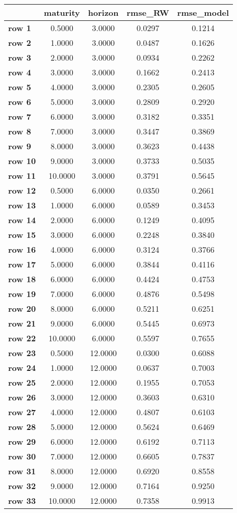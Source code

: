 \begin{tiny}\begin{tabular}{|l|c|c|c|c|}
\hline
&\textbf{maturity}&\textbf{horizon}&\textbf{rmse_RW}&\textbf{rmse_model}\\\hline
\textbf{row 1}&0.5000&3.0000&0.0297&0.1214\\\hline
\textbf{row 2}&1.0000&3.0000&0.0487&0.1626\\\hline
\textbf{row 3}&2.0000&3.0000&0.0934&0.2262\\\hline
\textbf{row 4}&3.0000&3.0000&0.1662&0.2413\\\hline
\textbf{row 5}&4.0000&3.0000&0.2305&0.2605\\\hline
\textbf{row 6}&5.0000&3.0000&0.2809&0.2920\\\hline
\textbf{row 7}&6.0000&3.0000&0.3182&0.3351\\\hline
\textbf{row 8}&7.0000&3.0000&0.3447&0.3869\\\hline
\textbf{row 9}&8.0000&3.0000&0.3623&0.4438\\\hline
\textbf{row 10}&9.0000&3.0000&0.3733&0.5035\\\hline
\textbf{row 11}&10.0000&3.0000&0.3791&0.5645\\\hline
\textbf{row 12}&0.5000&6.0000&0.0350&0.2661\\\hline
\textbf{row 13}&1.0000&6.0000&0.0589&0.3453\\\hline
\textbf{row 14}&2.0000&6.0000&0.1249&0.4095\\\hline
\textbf{row 15}&3.0000&6.0000&0.2248&0.3840\\\hline
\textbf{row 16}&4.0000&6.0000&0.3124&0.3766\\\hline
\textbf{row 17}&5.0000&6.0000&0.3844&0.4116\\\hline
\textbf{row 18}&6.0000&6.0000&0.4424&0.4753\\\hline
\textbf{row 19}&7.0000&6.0000&0.4876&0.5498\\\hline
\textbf{row 20}&8.0000&6.0000&0.5211&0.6251\\\hline
\textbf{row 21}&9.0000&6.0000&0.5445&0.6973\\\hline
\textbf{row 22}&10.0000&6.0000&0.5597&0.7655\\\hline
\textbf{row 23}&0.5000&12.0000&0.0300&0.6088\\\hline
\textbf{row 24}&1.0000&12.0000&0.0637&0.7003\\\hline
\textbf{row 25}&2.0000&12.0000&0.1955&0.7053\\\hline
\textbf{row 26}&3.0000&12.0000&0.3603&0.6310\\\hline
\textbf{row 27}&4.0000&12.0000&0.4807&0.6103\\\hline
\textbf{row 28}&5.0000&12.0000&0.5624&0.6469\\\hline
\textbf{row 29}&6.0000&12.0000&0.6192&0.7113\\\hline
\textbf{row 30}&7.0000&12.0000&0.6605&0.7837\\\hline
\textbf{row 31}&8.0000&12.0000&0.6920&0.8558\\\hline
\textbf{row 32}&9.0000&12.0000&0.7164&0.9250\\\hline
\textbf{row 33}&10.0000&12.0000&0.7358&0.9913\\\hline
\end{tabular}
\end{tiny}